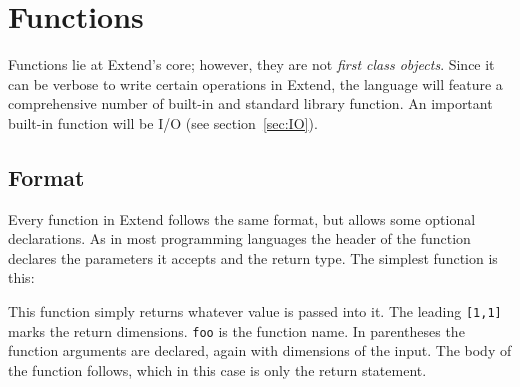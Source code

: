 \section{Functions}
Functions lie at Extend's core; however, they are not \textit{first class objects}. Since it can be verbose to write certain operations in Extend, the language will feature a comprehensive number of built-in and standard library function. An important built-in function will be I/O (see section~\ref{sec:IO}).
\subsection{Format}
Every function in Extend follows the same format, but allows some optional declarations. As in most programming languages the header of the function declares the parameters it accepts and the return type. The simplest function is this:

This function simply returns whatever value is passed into it. The leading \texttt{[1,1]} marks the return dimensions. \texttt{foo} is the function name. In parentheses the function arguments are declared, again with dimensions of the input. The body of the function follows, which in this case is only the return statement.
